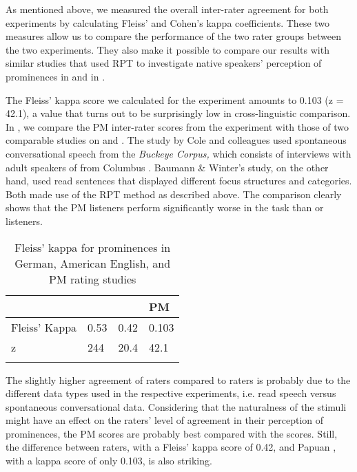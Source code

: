\documentclass[output=paper
,modfonts
,nonflat]{langsci/langscibook}
\begin{document}
As mentioned above, we measured the overall inter-rater agreement for both experiments by calculating Fleiss’ and Cohen’s kappa coefficients. These two measures allow us to compare the performance of the two rater groups between the two experiments. They also make it possible to compare our results with similar studies that used RPT to investigate native speakers’ perception of prominences in  and in . 

The Fleiss’ kappa score we calculated for the  experiment amounts to 0.103 (z = 42.1), a value that turns out to be surprisingly low in cross-linguistic comparison. In , we compare the PM inter-rater scores from the  experiment with those of two comparable studies on  \citep{Mo2008, Cole2010a} and  \citep{BaumannWi2015}. The study by Cole and colleagues used spontaneous conversational speech from the \textit{Buckeye Corpus,} which consists of interviews with adult speakers of  from Columbus \citep{Pitt2007}. Baumann \& Winter’s study, on the other hand, used read sentences that displayed different focus structures and  categories. Both made use of the RPT method as described above. The comparison clearly shows that the PM listeners perform significantly worse in the  task than  or  listeners.

\begin{table}
\begin{tabularx}{\textwidth}{XXXl}
	\lsptoprule
	& \bfseries \ili{German} & \bfseries \ili{English} & \bfseries PM\\
	\midrule
	Fleiss’ Kappa & 0.53 & 0.42 & 0.103\\
	z & 244 & 20.4 & 42.1\\
	\lspbottomrule
\end{tabularx}
\caption{Fleiss’ kappa for prominences in German, American English, and PM rating studies}
\label{t1}
\end{table}

\noindent
The slightly higher agreement of  raters compared to  raters is probably due to the different data types used in the respective experiments, i.e. read speech versus spontaneous conversational data. Considering that the naturalness of the stimuli might have an effect on the raters’ level of agreement in their perception of prominences, the PM scores are probably best compared with the  scores. Still, the difference between  raters, with a Fleiss’ kappa score of 0.42, and Papuan , with a kappa score of only 0.103, is also striking.
\end{document}
